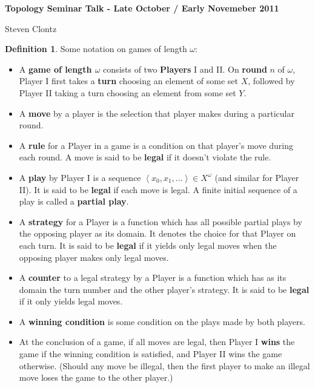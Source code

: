 \documentclass[11pt]{article}
\theoremstyle{plain}
\theoremstyle{definition}
\newtheorem{definition}[theorem]{Definition}
\theoremstyle{remark}
\begin{document}
\centerline{\bf Topology Seminar Talk - Late October / Early Novemeber 2011}
\centerline{Steven Clontz}

\begin{definition} Some notation on games of length $\omega$:

\begin{itemize}
\item A \textbf{game of length $\omega$} consists of two \textbf{Players} I and II. On \textbf{round} $n$ of $\omega$, Player I first takes a \textbf{turn} choosing an element of some set $X$, followed by Player II taking a turn choosing an element from some set $Y$.

\item A \textbf{move} by a player is the selection that player makes during a particular round. 

\item A \textbf{rule} for a Player in a game is a condition on that player's move during each round. A move is said to be \textbf{legal} if it doesn't violate the rule.

\item A \textbf{play} by Player I is a sequence $\left<x_0,x_1,\dots\right> \in X^\omega$ (and similar for Player II). It is said to be \textbf{legal} if each move is legal. A finite initial sequence of a play is called a \textbf{partial play}.

\item A \textbf{strategy} for a Player is a function which has all possible partial plays by the opposing player as its domain. It denotes the choice for that Player on each turn. It is said to be \textbf{legal} if it yields only legal moves when the opposing player makes only legal moves.

\item A \textbf{counter} to a legal strategy by a Player is a function which has as its domain the turn number and the other player's strategy. It is said to be \textbf{legal} if it only yields legal moves.

\item A \textbf{winning condition} is some condition on the plays made by both players.

\item At the conclusion of a game, if all moves are legal, then Player I \textbf{wins} the game if the winning condition is satisfied, and Player II wins the game otherwise. (Should any move be illegal, then the first player to make an illegal move loses the game to the other player.)
\end{itemize}
\end{definition}
\end{document}
